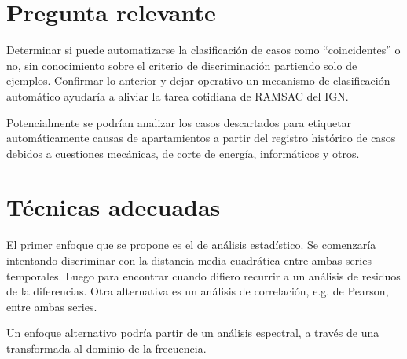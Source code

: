 \documentclass[11pt,spanish,a4paper]{article}
\begin{document}



\section*{Pregunta relevante}
Determinar si puede automatizarse la clasificación de casos como ``coincidentes'' o no, sin conocimiento sobre el criterio de discriminación partiendo solo de ejemplos.
Confirmar lo anterior y dejar operativo un mecanismo de clasificación automático ayudaría a aliviar la tarea cotidiana de RAMSAC del IGN.

Potencialmente se podrían analizar los casos descartados para etiquetar automáticamente causas de apartamientos a partir del registro histórico de casos debidos a cuestiones mecánicas, de corte de energía, informáticos y otros.

\section*{Técnicas adecuadas}
El primer enfoque que se propone es el de análisis estadístico.
Se comenzaría intentando discriminar con la distancia media cuadrática entre ambas series temporales.
Luego para encontrar cuando difiero recurrir a un análisis de residuos de la diferencias.
Otra alternativa es un análisis de correlación, e.g. de Pearson, entre ambas series.

Un enfoque alternativo podría partir de un análisis espectral, a través de una transformada al dominio de la frecuencia.



\printbibliography[title= Referencias, heading=bibintoc]
\end{document}
